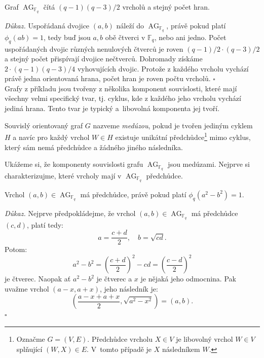 \documentclass[12pt]{report}
\DeclareMathOperator{\AG}{AG}
\begin{document}
\begin{veta}\label{pocetprvkuAG}
Graf $\AG_{\mathbb{F}_q}$ čítá $(q-1)(q-3)/2$ vrcholů a stejný počet hran.
\end{veta}
\noindent \textit{Důkaz.} Uspořádaná dvojice $(a,b)$ náleží do $\AG_{\mathbb{F}_q}$, právě pokud platí $\phi_q(ab) = 1$, tedy buď jsou $a,b$ obě čtverci v $\mathbb{F}_q$, nebo ani jedno. Počet uspořádaných dvojic různých nenulových čtverců je roven $(q-1)/2 \cdot (q-3)/2$ a stejný počet přispívají dvojice nečtverců. Dohromady získáme $2 \cdot (q-1)(q-3)/4$ vyhovujících dvojic. Protože z každého vrcholu vychází právě jedna orientovaná hrana, počet hran je roven počtu vrcholů. \hfill $\square$\\

Grafy z příkladu jsou tvořeny z několika komponent souvislosti, které mají všechny velmi specifický tvar, tj. cyklus, kde z každého jeho vrcholu vychází jediná hrana. Tento tvar je typický a~libovolná komponenta jej tvoří.

\begin{definice}
Souvislý orientovaný graf $G$ nazveme \textit{medúzou}, pokud je tvořen jediným cyklem $H$ a navíc pro každý vrchol $W \in H$ existuje unikátní předchůdce\footnote[2]{Označme $G = (V,E)$. Předchůdce vrcholu $X \in V$ je libovolný vrchol $W \in V$ splňující $(W,X) \in E$. V~tomto případě je $X$ následníkem $W$.} mimo cyklus, který sám nemá předchůdce a žádného jiného následníka.
\end{definice}

Ukážeme si, že komponenty souvislosti grafu $\AG_{\mathbb{F}_q}$ jsou medúzami. Nejprve si charakterizujme, které vrcholy mají v $\AG_{\mathbb{F}_q}$ předchůdce.

\begin{lemma}\label{p}
Vrchol $(a,b) \in \AG_{\mathbb{F}_q}$ má předchůdce, právě pokud platí $\phi_q(a^2-b^2)=1$.
\end{lemma}

\noindent \textit{Důkaz.} Nejprve předpokládejme, že vrchol $(a,b) \in \AG_{\mathbb{F}_q}$ má předchůdce $(c,d)$, platí tedy:
\begin{equation*}
a = \frac{c+d}{2}, \quad b = \sqrt{cd}.
\end{equation*}
Potom:
\begin{equation*}
a^2 - b^2 = \left(\frac{c+d}{2} \right)^2 - cd = \left( \frac{c-d}{2} \right)^2
\end{equation*}
je čtverec. Naopak ať $a^2-b^2$ je čtverec a $x$ je nějaká jeho odmocnina. Pak uvažme vrchol $(a-x,a+x)$, jeho následník je: $$\left(\frac{a-x+a+x}{2}, \sqrt{a^2-x^2} \right)= \left(a, b \right).$$ \hfill $\square$
\end{document}
